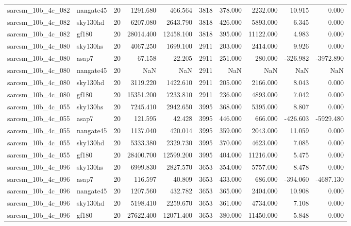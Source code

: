 \begin{tabular}{llrrrrrrrr}
sarcsm\_10b\_4c\_082 & nangate45 & 20 & 1291.680 & 466.564 & 3818 & 378.000 & 2232.000 & 10.915 & 0.000 \\
sarcsm\_10b\_4c\_082 & sky130hd & 20 & 6207.080 & 2643.790 & 3818 & 426.000 & 5893.000 & 6.345 & 0.000 \\
sarcsm\_10b\_4c\_082 & gf180 & 20 & 28014.400 & 12458.100 & 3818 & 395.000 & 11122.000 & 4.983 & 0.000 \\
sarcsm\_10b\_4c\_080 & sky130hs & 20 & 4067.250 & 1699.100 & 2911 & 203.000 & 2414.000 & 9.926 & 0.000 \\
sarcsm\_10b\_4c\_080 & asap7 & 20 & 67.158 & 22.205 & 2911 & 251.000 & 280.000 & -326.982 & -3972.890 \\
sarcsm\_10b\_4c\_080 & nangate45 & 20 & NaN & NaN & 2911 & NaN & NaN & NaN & NaN \\
sarcsm\_10b\_4c\_080 & sky130hd & 20 & 3119.220 & 1422.610 & 2911 & 205.000 & 2166.000 & 8.043 & 0.000 \\
sarcsm\_10b\_4c\_080 & gf180 & 20 & 15351.200 & 7233.810 & 2911 & 236.000 & 4893.000 & 7.042 & 0.000 \\
sarcsm\_10b\_4c\_055 & sky130hs & 20 & 7245.410 & 2942.650 & 3995 & 368.000 & 5395.000 & 8.807 & 0.000 \\
sarcsm\_10b\_4c\_055 & asap7 & 20 & 121.595 & 42.428 & 3995 & 446.000 & 666.000 & -426.603 & -5929.480 \\
sarcsm\_10b\_4c\_055 & nangate45 & 20 & 1137.040 & 420.014 & 3995 & 359.000 & 2043.000 & 11.059 & 0.000 \\
sarcsm\_10b\_4c\_055 & sky130hd & 20 & 5333.380 & 2329.730 & 3995 & 370.000 & 4623.000 & 7.085 & 0.000 \\
sarcsm\_10b\_4c\_055 & gf180 & 20 & 28400.700 & 12599.200 & 3995 & 404.000 & 11216.000 & 5.475 & 0.000 \\
sarcsm\_10b\_4c\_096 & sky130hs & 20 & 6999.830 & 2827.570 & 3653 & 354.000 & 5757.000 & 8.478 & 0.000 \\
sarcsm\_10b\_4c\_096 & asap7 & 20 & 116.597 & 40.809 & 3653 & 433.000 & 686.000 & -394.060 & -4687.130 \\
sarcsm\_10b\_4c\_096 & nangate45 & 20 & 1207.560 & 432.782 & 3653 & 365.000 & 2404.000 & 10.908 & 0.000 \\
sarcsm\_10b\_4c\_096 & sky130hd & 20 & 5198.410 & 2259.670 & 3653 & 361.000 & 4734.000 & 7.108 & 0.000 \\
sarcsm\_10b\_4c\_096 & gf180 & 20 & 27622.400 & 12071.400 & 3653 & 380.000 & 11450.000 & 5.848 & 0.000 \\

\end{tabular}
